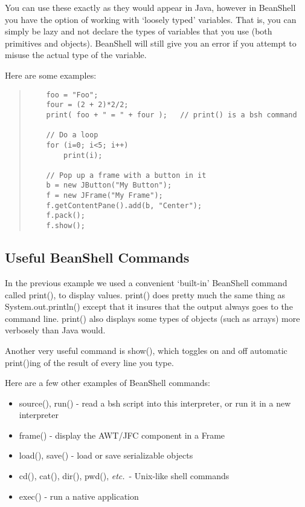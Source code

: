 \documentclass[twoside,11pt]{article}
\renewcommand{\_}{\texttt{\symbol{95}}}
\newcommand{\etc}{\textit{etc.}}
\begin{document}
You can use these exactly as they would appear in Java, however in
BeanShell you have the option of working with `loosely typed'
variables.  That is, you can simply be lazy and not declare the types
of variables that you use (both primitives and objects).  BeanShell
will still give you an error if you attempt to misuse the actual type
of the variable.

Here are some examples:
\begin{quote}
\begin{verbatim}
    foo = "Foo";
    four = (2 + 2)*2/2;
    print( foo + " = " + four );   // print() is a bsh command

    // Do a loop
    for (i=0; i<5; i++)
        print(i);

    // Pop up a frame with a button in it
    b = new JButton("My Button");
    f = new JFrame("My Frame");
    f.getContentPane().add(b, "Center");
    f.pack();
    f.show();
\end{verbatim}
\end{quote}

\subsection{Useful BeanShell Commands}

In the previous example we used a convenient `built-in' BeanShell
command called print(), to display values.  print() does pretty much
the same thing as System.out.println() except that it insures that the
output always goes to the command line.  print() also displays some
types of objects (such as arrays) more verbosely than Java would.

Another very useful command is show(), which toggles on and off
automatic print()ing of the result of every line you type.

Here are a few other examples of BeanShell commands:
\begin{itemize}
 \item source(), run() - read a bsh script into this interpreter, or
       run it in a new interpreter
 \item frame() - display the AWT/JFC component in a Frame
 \item load(), save() - load or save serializable objects
 \item cd(), cat(), dir(), pwd(), \etc\  - Unix-like shell commands
 \item exec() - run a native application
\end{itemize}
\end{document}
